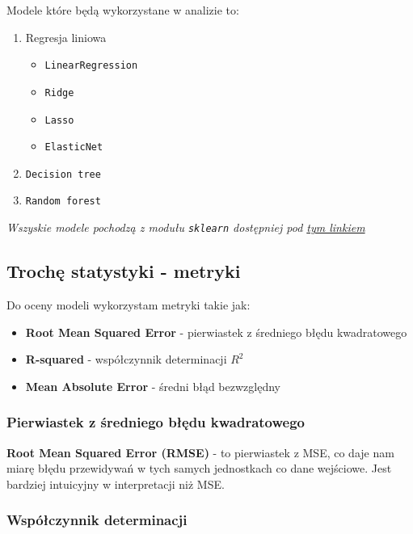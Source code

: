 \documentclass[a4paper]{article}
\begin{document}
\quad Modele które będą wykorzystane w analizie to:

\begin{enumerate}
    \item Regresja liniowa
          \begin{itemize}
              \item \texttt{LinearRegression}
              \item \texttt{Ridge}
              \item \texttt{Lasso}
              \item \texttt{ElasticNet}
          \end{itemize}
    \item \texttt{Decision tree}
    \item \texttt{Random forest}
\end{enumerate}

\textit{Wszyskie modele pochodzą z modułu \texttt{sklearn} dostępniej pod \href{https://scikit-learn.org/stable/}{tym linkiem}}

\subsection{Trochę statystyki - metryki}

\quad Do oceny modeli wykorzystam metryki takie jak:

\begin{itemize}
    \item \textbf{Root Mean Squared Error} - pierwiastek z średniego błędu kwadratowego
    \item \textbf{R-squared} - współczynnik determinacji $R^2$
    \item \textbf{Mean Absolute Error} - średni błąd bezwzględny
\end{itemize}

\subsubsection{Pierwiastek z średniego błędu kwadratowego}

\quad \textbf{Root Mean Squared Error (RMSE)} - to pierwiastek z MSE, co daje nam miarę błędu przewidywań w tych samych jednostkach co dane wejściowe. Jest bardziej intuicyjny w interpretacji niż MSE.

\subsubsection{Współczynnik determinacji}
\end{document}
